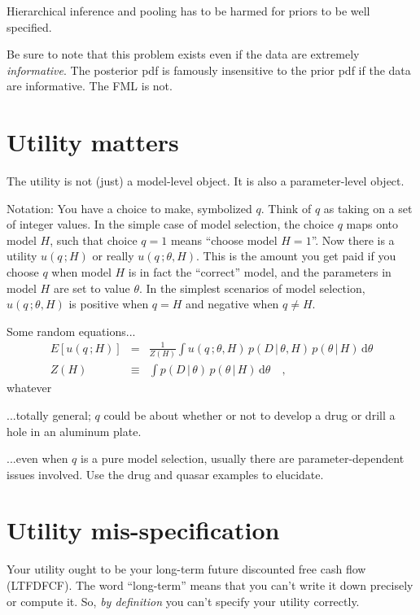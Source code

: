 \documentclass[12pt]{article}
\newcommand{\dd}{\mathrm{d}}
\newcommand{\given}{\,|\,}
\newcommand{\atfixed}{\,;}
\begin{document}
Hierarchical inference and pooling has to be harmed for priors to be well specified.

Be sure to note that this problem exists even if the data are extremely \emph{informative}.
The posterior pdf is famously insensitive to the prior pdf if the data are informative.
The FML is not.

\section{Utility matters}

The utility is not (just) a model-level object.
It is also a parameter-level object.

Notation: You have a choice to make, symbolized $q$.
Think of $q$ as taking on a set of integer values.
In the simple case of model selection,
  the choice $q$ maps onto model $H$,
  such that choice $q=1$ means ``choose model $H=1$''.
Now there is a utility $u(q\atfixed H)$ or really $u(q\atfixed\theta,H)$.
This is the amount you get paid if you choose $q$ when model $H$ is in fact the ``correct'' model,
  and the parameters in model $H$ are set to value $\theta$.
In the simplest scenarios of model selection,
  $u(q\atfixed\theta,H)$ is positive when $q=H$ and negative when $q\neq H$.

Some random equations...
\begin{eqnarray}
E[u(q\atfixed H)] &=& \frac{1}{Z(H)}\int u(q\atfixed\theta, H)\,p(D\given\theta,H)\,p(\theta\given H)\,\dd\theta
\\
Z(H) &\equiv& \int p(D\given\theta)\,p(\theta\given H)\,\dd\theta
\quad ,
\end{eqnarray}
whatever

...totally general; $q$ could be about whether or not to develop a drug or drill a hole in an aluminum plate.

...even when $q$ is a pure model selection, usually there are parameter-dependent issues involved.  Use the drug and quasar examples to elucidate.

\section{Utility mis-specification}

Your utility ought to be your long-term future discounted free cash flow (LTFDFCF).
The word ``long-term'' means that you can't write it down precisely or compute it.
So, \emph{by definition} you can't specify your utility correctly.
\end{document}
